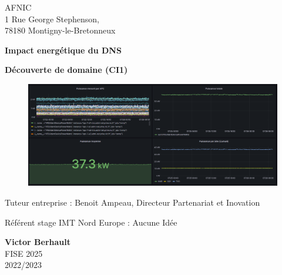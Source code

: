   \clearpage
  \thispagestyle{empty} %

  
  \begin{flushright}
  \begin{minipage}[t]{0.30\textwidth}
      \vspace{4.50cm}
AFNIC\\
1 Rue George Stephenson,\\
78180 Montigny-le-Bretonneux
  \end{minipage}
\end{flushright}
\vspace{0.50cm}
  {\centering\color{imtneAmbreText}\fontsize{40}{48}\selectfont\bfseries \hspace{0pt} Impact energétique du DNS \par}
  \vspace{0.5cm}
  {\centering\color{imtneAmbreText}\Large\bfseries  \hspace{0pt}Découverte de domaine (CI1) \par}
\begin{figure}[!htbp]
  \centering
  \begin{minipage}[t]{0.90\textwidth}
  \includegraphics[width=\textwidth]{paper/figures/GrafanaAPC.png}
  \label{fig:pageDeGarde}
  \end{minipage}
\end{figure}

  \vfill

\begin{minipage}[t]{0.65\textwidth}
\vspace{7pt}
Tuteur entreprise : Benoit Ampeau, Directeur Partenariat et Inovation

Référent stage IMT Nord Europe : Aucune Idée
\end{minipage}
\begin{minipage}[t]{0.30\textwidth}
\begin{flushright}
\textbf{Victor Berhault}\\
FISE 2025\\
2022/2023
\end{flushright}
\end{minipage}


